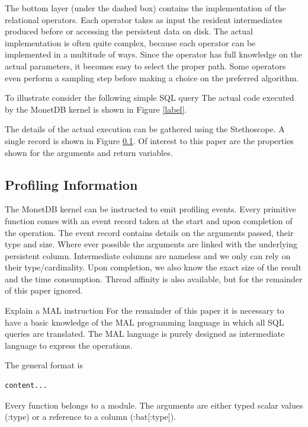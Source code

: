 The bottom layer (under the dashed box) contains the implementation of the relational operators.
Each operator takes as input the resident intermediates produced before
or accessing the persistent data on disk.
The actual implementation is often quite complex,
because each operator can be implemented in a multitude of ways.
Since the operator has full knowledge on the actual parameters,
it becomes easy to select the proper path.
Some operators even perform a sampling step before making a choice on the
 preferred algorithm.

To illustrate consider the following simple SQL query
The actual code executed by the MonetDB kernel is shown in Figure \ref{label}.

The details of the actual execution can be gathered using the Stethoscope.
A single record is shown in Figure \ref{}. Of interest to this paper are
the properties shown for the arguments and return variables.

\subsection{Profiling Information}
The MonetDB kernel can be instructed to emit profiling events.
Every primitive function comes with an event record taken at the start and
upon completion of the operation. The event record contains details on the
arguments passed, their type and size. Where ever possible the arguments
are linked with the underlying persistent column. Intermediate columns are
nameless and we only can rely on their type/cardinality.
Upon completion, we also know the exact size of the result and the time consumption.
Thread affinity is also available, but for the remainder of this paper ignored.

Explain a MAL instruction
For the remainder of this paper it is necessary to have a basic knowledge of the
MAL programming language in which all SQL queries are translated.
The MAL language is purely designed as intermediate language to express the operations.

The general format is
\begin{verbatim}
content...
\end{verbatim}
Every function belongs to a module. The arguments are either typed scalar
values (:type) or a reference to a column (:bat[:type]).
